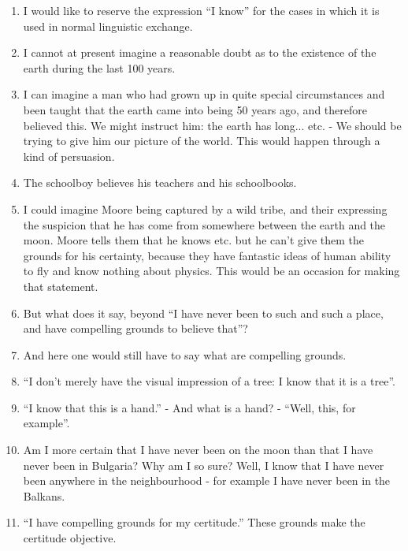 \documentclass{book}
\begin{document}
\begin{enumerate}
\item
I would like to reserve the expression ``I know'' for the cases in which it is
used in normal linguistic exchange.

\item
I cannot at present imagine a reasonable doubt as to the existence of the earth
during the last 100 years.

\item
I can imagine a man who had grown up in quite special circumstances and been
taught that the earth came into being 50 years ago, and therefore believed
this. We might instruct him: the earth has long... etc. - We should be trying
to give him our picture of the world.  This would happen through a kind of
persuasion.

\item
The schoolboy believes his teachers and his schoolbooks.

\item
I could imagine Moore being captured by a wild tribe, and their expressing the
suspicion that he has come from somewhere between the earth and the moon. Moore
tells them that he knows etc. but he can't give them the grounds for his
certainty, because they have fantastic ideas of human ability to fly and know
nothing about physics. This would be an occasion for making that statement.

\item
But what does it say, beyond ``I have never been to such and such a place, and
have compelling grounds to believe that''?

\item
And here one would still have to say what are compelling grounds.

\item
``I don't merely have the visual impression of a tree: I know that it is a
tree''.

\item
``I know that this is a hand.'' - And what is a hand? - ``Well, this, for
example''.

\item
Am I more certain that I have never been on the moon than that I have never
been in Bulgaria? Why am I so sure? Well, I know that I have never been
anywhere in the neighbourhood - for example I have never been in the Balkans.

\item
``I have compelling grounds for my certitude.'' These grounds make the
certitude objective.


\end{enumerate}
\end{document}
